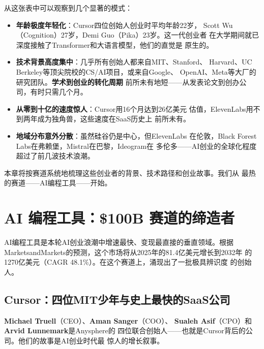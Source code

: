 从这张表中可以观察到几个显著的模式：

\begin{itemize}
  \item \textbf{年龄极度年轻化}：Cursor四位创始人创业时平均年龄22岁，
    Scott Wu（Cognition）27岁，Demi Guo（Pika）23岁。这一代创业者
    在大学期间就已深度接触了Transformer和大语言模型，他们的直觉是
    原生的。
  \item \textbf{技术背景高度集中}：几乎所有创始人都来自MIT、Stanford、
    Harvard、UC Berkeley等顶尖院校的CS/AI项目，或来自Google、
    OpenAI、Meta等大厂的研究团队。\textbf{学术到创业的转化周期}
    前所未有地短——从发表论文到创办公司，有时只需几个月。
  \item \textbf{从零到十亿的速度惊人}：Cursor用16个月达到26亿美元
    估值，ElevenLabs用不到两年成为独角兽，这些速度在SaaS历史上
    前所未有。
  \item \textbf{地域分布意外分散}：虽然硅谷仍是中心，但ElevenLabs
    在伦敦，Black Forest Labs在弗赖堡，Mistral在巴黎，Ideogram在
    多伦多——AI创业的全球化程度超过了前几波技术浪潮。
\end{itemize}

本章将按赛道系统地梳理这些创业者的背景、技术路径和创业故事。我们从
最热的赛道——AI编程工具——开始。


\section{AI 编程工具：\$100B 赛道的缔造者}
\label{sec:founders-coding}

AI编程工具是本轮AI创业浪潮中增速最快、变现最直接的垂直领域。根据
MarketsandMarkets的预测，这个市场将从2025年的81.4亿美元增长到2032年
的1270亿美元（CAGR 48.1\%）。在这个赛道上，涌现出了一批极具辨识度
的创始人。

\subsection{Cursor：四位MIT少年与史上最快的SaaS公司}
\label{subsec:founders-cursor}

\textbf{Michael Truell}（CEO）、\textbf{Aman Sanger}（COO）、
\textbf{Sualeh Asif}（CPO）和\textbf{Arvid Lunnemark}是Anysphere的
四位联合创始人——也就是Cursor背后的公司。他们的故事是AI创业时代最
惊人的增长叙事。

